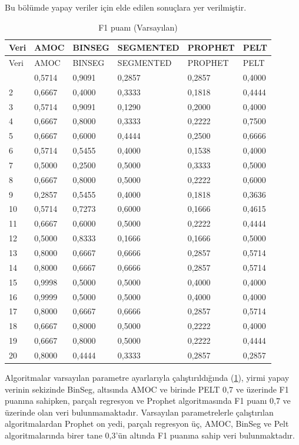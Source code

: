 \documentclass[12pt,twoside]{deuthesis}
\begin{document}
Bu bölümde yapay veriler için elde edilen sonuçlara yer verilmiştir.

\begin{longtable}[]{@{}llllll@{}}
\caption{\label{tab:nvar8} F1 puanı (Varsayılan)}\tabularnewline
\toprule\noalign{}
Veri & AMOC & BINSEG & SEGMENTED & PROPHET & PELT \\
\midrule\noalign{}
\endfirsthead
\toprule\noalign{}
Veri & AMOC & BINSEG & SEGMENTED & PROPHET & PELT \\
\midrule\noalign{}
\endhead
\bottomrule\noalign{}
\endlastfoot
1 & 0,5714 & 0,9091 & 0,2857 & 0,2857 & 0,4000 \\
2 & 0,6667 & 0,4000 & 0,3333 & 0,1818 & 0,4444 \\
3 & 0,5714 & 0,9091 & 0,1290 & 0,2000 & 0,4000 \\
4 & 0,6667 & 0,8000 & 0,3333 & 0,2222 & 0,7500 \\
5 & 0,6667 & 0,6000 & 0,4444 & 0,2500 & 0,6666 \\
6 & 0,5714 & 0,5455 & 0,4000 & 0,1538 & 0,4000 \\
7 & 0,5000 & 0,2500 & 0,5000 & 0,3333 & 0,5000 \\
8 & 0,6667 & 0,8000 & 0,5000 & 0,2222 & 0,6000 \\
9 & 0,2857 & 0,5455 & 0,4000 & 0,1818 & 0,3636 \\
10 & 0,5714 & 0,7273 & 0,6000 & 0,1666 & 0,4615 \\
11 & 0,6667 & 0,6000 & 0,5000 & 0,2222 & 0,4444 \\
12 & 0,5000 & 0,8333 & 0,1666 & 0,1666 & 0,5000 \\
13 & 0,8000 & 0,6667 & 0,6666 & 0,2857 & 0,5714 \\
14 & 0,8000 & 0,6667 & 0,6666 & 0,2857 & 0,5714 \\
15 & 0,9998 & 0,5000 & 0,5000 & 0,4000 & 0,4000 \\
16 & 0,9999 & 0,5000 & 0,5000 & 0,4000 & 0,4000 \\
17 & 0,8000 & 0,6667 & 0,6666 & 0,2857 & 0,5714 \\
18 & 0,6667 & 0,8000 & 0,5000 & 0,2222 & 0,4000 \\
19 & 0,6667 & 0,8000 & 0,5000 & 0,2222 & 0,4444 \\
20 & 0,8000 & 0,4444 & 0,3333 & 0,2857 & 0,2857 \\
\end{longtable}

Algoritmalar varsayılan parametre ayarlarıyla çalıştırıldığında (\ref{tab:nvar8}), yirmi yapay verinin sekizinde BinSeg, altısında AMOC ve birinde PELT 0,7 ve üzerinde F1 puanına sahipken, parçalı regresyon ve Prophet algoritmasında F1 puanı 0,7 ve üzerinde olan veri bulunmamaktadır. Varsayılan parametrelerle çalıştırılan algoritmalardan Prophet on yedi, parçalı regresyon üç, AMOC, BinSeg ve Pelt algoritmalarında birer tane 0,3'ün altında F1 puanına sahip veri bulunmaktadır.
\end{document}
